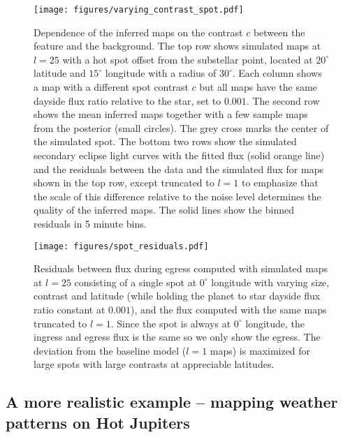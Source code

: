 \documentclass[modern]{aastex631}
\begin{document}
\begin{figure}[t!]
    \begin{centering}
    \texttt{[image: figures/varying\_contrast\_spot.pdf]}
    \caption{
        Dependence of the inferred maps on the contrast $c$ between the feature and the background.
        The top row shows simulated maps at $l=25$ with a hot spot offset from the substellar point, located at
        $20^\circ$ latitude and $15^\circ$ longitude with a radius of $30^\circ$.
        Each column shows a map with a different spot contrast $c$ but all maps have the same dayside 
        flux ratio relative to the star, set to $0.001$.
        The second row shows the mean inferred maps together with a few sample maps from the posterior
        (small circles). 
        The grey cross marks the center of the simulated spot. 
        The bottom two rows show the simulated secondary eclipse light curves with the fitted flux 
        (solid orange line) and the residuals between the data and the simulated flux for maps 
        shown in the top row, except truncated to $l=1$ to emphasize that the scale of this difference 
        relative to the noise level determines the quality of the inferred maps.
        The solid lines show the binned residuals in 5 minute bins. 
    }
    \label{fig:varying_contrast_spot}
    \end{centering}
\end{figure}

\begin{figure}[t!]
    \begin{centering}
    \texttt{[image: figures/spot\_residuals.pdf]}
    \caption{
       Residuals between flux during egress computed with simulated maps at $l=25$ consisting of a single spot at 
       $0^\circ$ longitude with varying size, contrast and latitude (while holding the planet to star
       dayside flux ratio constant at $0.001$), and the flux computed with the same maps truncated to 
       $l=1$. 
       Since the spot is always at $0^\circ$ longitude, the ingress and egress flux is the same
       so we only show the egress.
       The deviation from the baseline model ($l=1$ maps) is maximized for large spots with large 
       contrasts at appreciable latitudes.
    }
    \label{fig:spot_residuals}
    \end{centering}
\end{figure}


\subsection{A more realistic example -- mapping weather patterns on Hot Jupiters}
\label{ssec:weather}
\end{document}
